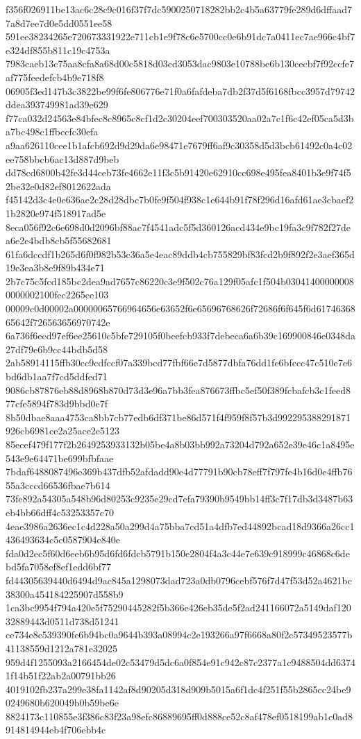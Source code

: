 {f356f026911be13ac6c28c9c016f37f7dc5900250718282bb2c4b5a63779fe289d6dffaad77a8d7ee7d0e5dd0551ee58
591ee38234265e720673331922e711cb1e9f78c6e5700cc0e6b91dc7a0411ec7ae966c4bf7e324df855b811c19c4753a
7983caeb13c75aa8cfa8a68d00c5818d03cd3053dac9803e10788be6b130cecbf7f92ccfe7af775feedefcb4b9e718f8
06905f3ed147b3c3822be99f6fe806776e71f0a6fafdeba7db2f37d5f6168fbcc3957d79742ddea393749981ad39e629
f77ca032d24563e84bfec8c8965c8cf1d2c30204eef700303520aa02a7c1f6c42ef05ca5d3ba7bc498c1ffbccfc30efa
a9aa626110cee1b1afcb692d9d29da6e98471e7679ff6af9c30358d5d3bcb61492c0a4c02ee758bbcb6ac13d887d9beb
dd78cd6800b42fe3d44ceb73fe4662e11f3c5b91420e62910cc698e495fea8401b3e9f74f52be32e0d82ef8012622ada
f45142d3c4e0e636ae2c28d28dbc7b0fe9f504f938c1e644b91f78f296d16afd61ae3cbaef21b2820e974f518917ad5e
8eca056f92c6e698d0d2096bf88ac7f4541adc5f5d360126acd434e9bc19fa3c9f782f27dea6e2e4bdb8cb5f55682681
61fa6dccdf1b265d6f0f982b53c36a5e4eac89ddb4cb755829bf83fcd2b9f892f2e3aef365d19e3ea3b8e9f89b434e71
2b7c75c5fcd185bc2dea9ad7657c86220c3e9f502c76a129f05afc1f504b030414000000080000002100fec2265ce103
00009c0d00002a00000065766964656e63652f6e65696768626f72686f6f645f6d6174636865642f726563656970742e
6a736f6ecd97ef6ee25610c5bfe729105f0beefcb933f7debeca6a6b39c169900846e0348da27df79e6b9cc44bdb5d58
2ab58914115ffb30cc9cdfccf07a339bcd77fbf66e7d5877dbfa76dd1fe6bfccc47c510e7e6bd6db1aa7f7cd5ddfed71
9086cb87876eb88d8968b870d73d3e96a7bb3fea876673ffbc5ef50f389fcbafcb3c1feed877cfe5894f783d9bbd0e7f
8b50dbae8aaa4753ca8bb7cb77edb6df371be86d571f4f959f8f57b3d992295388291871926cb6981ce2a25ace2e5123
85ecef479f177f2b2649253933132b05be4a8b03bb992a73204d792a652e39e46c1a8495e543e9e64471be699bfbfaae
7bdaf6488087496e369b437dfb52afdadd90e4d77791b90cb78eff7f797fe4b16d0e4ffb7655a3cccd66536fbae7b614
73fe892a54305a548b96d80253c9235e29cd7efa79390b9549bb14ff3c7f17db3d3487b63eb4bb66dff4c53253357c70
4eae3986a2636ec1c4d228a50a299d4a75bba7cd51a4dfb7ed44892bcad18d9366a26cc1436493634c5c0587904c840e
fda0d2ec5f60d6eeb6b95d6fd6fdcb5791b150e2804f4a3c44e7e639c918999c46868c6debd5fa7058ef8ef1edd6bf77
fd44305639440d6494d9ac845a1298073dad723a0db0796cebf576f7d47f53d52a4621bc38300a454184225907d558b9
1ca3bc9954f794a420e5f75290445282f5b366e426eb35de5f2ad241166072a5149daf12032889443d0511d738d51241
ce734e8c539390fe6b94bc0a9644b393a08994c2e193266a97f6668a80f2c57349523577b41138559d1212a781e32025
959d4f1255093a2166454de02c53479d5dc6a0f854e91c942c87c2377a1c9488504dd63741f14b51f22ab2a00791bb26
4019102fb237a299e38fa1142af8d90205d318d909b5015a6f1dc4f251f55b2865cc24be90249680b620049b0b59be6e
8824173c110855e3f386c83f23a98efc86889695ff0d888ce52c8af478ef0518199ab1c0ad8914814944eb4f706ebb4c
}
